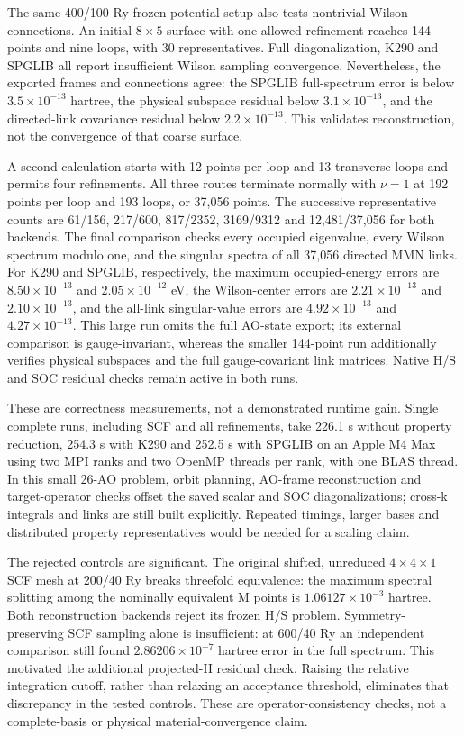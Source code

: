 \documentclass[11pt]{article}
\begin{document}
The same 400/100 Ry frozen-potential setup also tests nontrivial
Wilson connections. An initial $8\times5$ surface with one allowed
refinement reaches 144 points and nine loops, with 30 representatives.
Full diagonalization, K290 and SPGLIB all report insufficient Wilson
sampling convergence. Nevertheless, the exported frames and connections
agree: the SPGLIB full-spectrum error is below $3.5\times10^{-13}$
hartree, the physical subspace residual below $3.1\times10^{-13}$,
and the directed-link covariance residual below $2.2\times10^{-13}$.
This validates reconstruction, not the convergence of that coarse surface.

A second calculation starts with 12 points per loop and 13 transverse
loops and permits four refinements. All three routes terminate normally
with $\nu=1$ at 192 points per loop and 193 loops, or 37,056 points.
The successive representative counts are 61/156, 217/600, 817/2352,
3169/9312 and 12,481/37,056 for both backends. The final comparison
checks every occupied eigenvalue, every Wilson spectrum modulo one,
and the singular spectra of all 37,056 directed MMN links.
For K290 and SPGLIB, respectively, the maximum occupied-energy errors
are $8.50\times10^{-13}$ and $2.05\times10^{-12}$ eV, the Wilson-center
errors are $2.21\times10^{-13}$ and $2.10\times10^{-13}$, and the
all-link singular-value errors are $4.92\times10^{-13}$ and
$4.27\times10^{-13}$. This large run omits the full AO-state export;
its external comparison is gauge-invariant, whereas the smaller
144-point run additionally verifies physical subspaces and the full
gauge-covariant link matrices. Native H/S and SOC residual checks
remain active in both runs.

These are correctness measurements, not a demonstrated runtime gain.
Single complete runs, including SCF and all refinements, take
226.1 s without property reduction, 254.3 s with K290 and 252.5 s
with SPGLIB on an Apple M4 Max using two MPI ranks and two OpenMP
threads per rank, with one BLAS thread. In this small 26-AO problem,
orbit planning, AO-frame reconstruction and target-operator checks
offset the saved scalar and SOC diagonalizations; cross-k integrals
and links are still built explicitly. Repeated timings, larger bases
and distributed property representatives would be needed for a
scaling claim.

The rejected controls are significant. The original shifted,
unreduced $4\times4\times1$ SCF mesh at 200/40 Ry breaks
threefold equivalence: the maximum spectral splitting among
the nominally equivalent M points is
$1.06127\times10^{-3}$ hartree. Both reconstruction backends
reject its frozen H/S problem. Symmetry-preserving SCF sampling
alone is insufficient: at 600/40 Ry an independent comparison
still found $2.86206\times10^{-7}$ hartree error in the full
spectrum. This motivated the additional projected-H residual
check. Raising the relative integration cutoff, rather than
relaxing an acceptance threshold, eliminates that discrepancy
in the tested controls. These are operator-consistency checks,
not a complete-basis or physical material-convergence claim.
\end{document}
